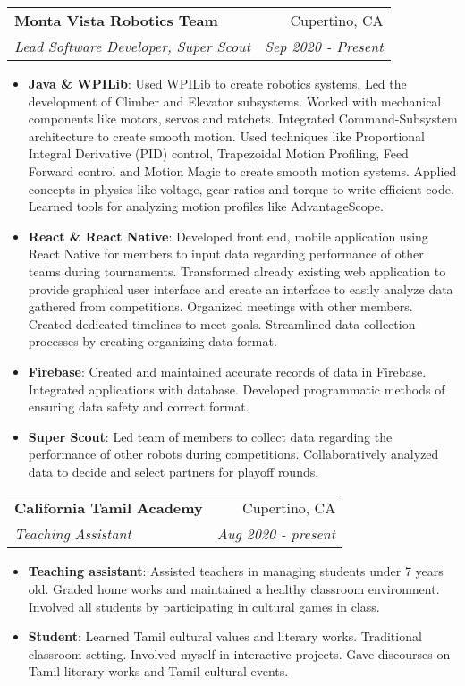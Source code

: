 \documentclass[letterpaper,11pt]{article}
\makeatletter
\newcommand{\resumeItem}[2]{
  \item\small{
    \textbf{#1}{: #2 \vspace{-2pt}}
  }
}
\newcommand{\resumeSubheading}[4]{
  \vspace{-1pt}\item
    \begin{tabular*}{0.97\textwidth}{l@{\extracolsep{\fill}}r}
      \textbf{#1} & #2 \\
      \textit{\small#3} & \textit{\small #4} \\
    \end{tabular*}\vspace{-5pt}
}
\newcommand{\resumeItemListStart}{\begin{itemize}}
\newcommand{\resumeItemListEnd}{\end{itemize}\vspace{-5pt}}
\makeatother
\begin{document}
    \resumeSubheading
      {Monta Vista Robotics Team}{Cupertino, CA}
      {Lead Software Developer, Super Scout}{Sep 2020 - Present}
      \resumeItemListStart
        \resumeItem{Java \& WPILib}
          {Used WPILib to create robotics systems. Led the development of Climber and Elevator subsystems. Worked with mechanical components like motors, servos and ratchets. Integrated Command-Subsystem architecture to create smooth motion. Used techniques like Proportional Integral Derivative (PID) control, Trapezoidal Motion Profiling, Feed Forward control and Motion Magic to create smooth motion systems. Applied concepts in physics like voltage, gear-ratios and torque to write efficient code. Learned tools for analyzing motion profiles like AdvantageScope.}
        \resumeItem{React \& React Native}
          {Developed front end, mobile application using React Native for members to input data regarding performance of other teams during tournaments. Transformed already existing web application to provide graphical user interface and create an interface to easily analyze data gathered from competitions. Organized meetings with other members. Created dedicated timelines to meet goals. Streamlined data collection processes by creating organizing data format.}
        \resumeItem{Firebase}
            {Created and maintained accurate records of data in Firebase. Integrated applications with database. Developed programmatic methods of ensuring data safety and correct format.}
        \resumeItem{Super Scout}
            {Led team of members to collect data regarding the performance of other robots during competitions. Collaboratively analyzed data to decide and select partners for playoff rounds.}
      \resumeItemListEnd

    \resumeSubheading
      {California Tamil Academy}{Cupertino, CA}
      {Teaching Assistant}{Aug 2020 - present}
      \resumeItemListStart
        \resumeItem{Teaching assistant}
          {Assisted teachers in managing students under 7 years old. Graded home works and maintained a healthy classroom environment. Involved all students by participating in cultural games in class.}
        \resumeItem{Student}
          {Learned Tamil cultural values and literary works. Traditional classroom setting. Involved myself in interactive projects. Gave discourses on Tamil literary works and Tamil cultural events.}
      \resumeItemListEnd
\end{document}
